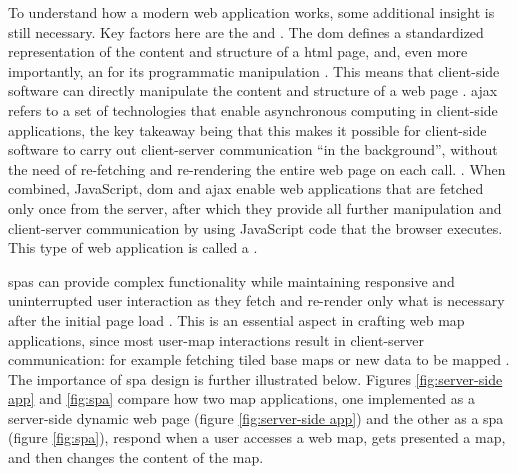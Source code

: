 To understand how a modern web application works,
some additional insight is still necessary.
Key factors here are the  and
.
The \acrshort{dom} defines a standardized representation of
the content and structure of a \acrshort{html} page,
and, even more importantly, an  for its
programmatic manipulation \parencite{w3cdom}.
This means that client-side software can
directly manipulate the content and structure of a web page \parencite{w3cdom}.
\acrshort{ajax} refers to a set of technologies that
enable asynchronous computing in client-side applications,
the key takeaway being that this makes it possible for client-side software to
carry out client-server communication \enquote{in the background},
without the need of re-fetching and re-rendering the entire web page on each call.
\parencite{gar2005}.
When combined, JavaScript, \acrshort{dom} and \acrshort{ajax} enable
web applications that are fetched only once from the server,
after which they provide all further manipulation and client-server communication by using
JavaScript code that the browser executes.
This type of web application
is called a  \parencite{fin2014}.

\acrshort{spa}s can provide complex functionality while
maintaining responsive and uninterrupted user interaction
as they fetch and re-render only what is necessary
after the initial page load \parencite{fin2014}.
This is an essential aspect in crafting web map applications,
since most user-map interactions result in client-server communication:
for example fetching tiled base maps or new data to be mapped
\parencite{mai2017}.
The importance of \acrshort{spa} design is further illustrated below.
Figures \ref{fig:server-side app} and \ref{fig:spa} compare
how two map applications,
one implemented as a server-side dynamic web page (figure \ref{fig:server-side app})
and the other as a \acrshort{spa} (figure \ref{fig:spa}),
respond when a user accesses a web map,
gets presented a map, and then changes the content of the map.

